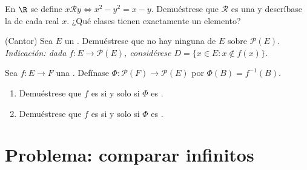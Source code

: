 \begin{exercise}[$\star\star$]\label{exo:b1:logic:10}
En $\R$ se define $x \mathbin{\mathcal{R}} y \iff x^2 - y^2 = x - y$.
Demuéstrese que $\mathcal{R}$ es una  y
descríbase la  de cada real $x$. ¿Qué clases
tienen exactamente un elemento?
\end{exercise}

\begin{exercise}[$\star\star\star$]\label{exo:b1:logic:11}
(Cantor) Sea $E$ un . Demuéstrese que no hay ninguna
 de $E$ sobre $\mathcal{P}(E)$. \emph{Indicación: dada
$f \colon E \to \mathcal{P}(E)$, considérese $D = \{x \in E : x \notin f(x)\}$.}
\end{exercise}

\begin{exercise}[$\star\star\star$]\label{exo:b1:logic:12}
Sea $f \colon E \to F$ una . Defínase
$\Phi \colon \mathcal{P}(F) \to \mathcal{P}(E)$ por $\Phi(B) = f^{-1}(B)$.
\begin{enumerate}
  \item Demuéstrese que $f$ es  si y solo si $\Phi$ es
        .
  \item Demuéstrese que $f$ es  si y solo si $\Phi$ es
        .
\end{enumerate}
\end{exercise}

\section{Problema: comparar infinitos}

